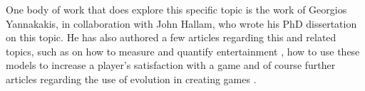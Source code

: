 One body of work that does explore this specific topic is the work of Georgios
Yannakakis, in collaboration with John Hallam, who wrote his PhD dissertation
\citep{yannakakis2005ai} on this topic. He has also authored a few articles
regarding this and related topics, such as on how to measure and quantify
entertainment
\citep{yannakakis2007modeling,yannakakis2008model,yannakakis2008entertainment},
how to use these models to increase a player's satisfaction with a game
\citep{yannakakis2009real,yannakakis2008model} and of course further articles
regarding the use of evolution in creating games
\citep{yannakakis2004evolving,yannakakis2004interactive}.




